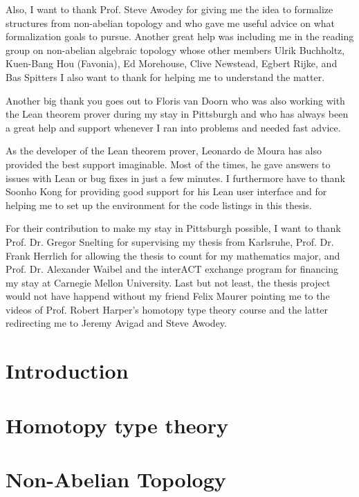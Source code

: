 \documentclass[12pt,headings=optiontohead]{book}
\theoremstyle{definition}
\begin{document}
Also, I want to thank Prof. Steve Awodey for giving me the idea to formalize structures
from non-abelian topology and who gave me useful advice on what formalization goals
to pursue.
Another great help was including me in the reading group on non-abelian algebraic
topology whose other members 
Ulrik Buchholtz, Kuen-Bang Hou (Favonia), Ed Morehouse, Clive Newstead, Egbert Rijke, and Bas Spitters
I also want to thank for helping me to understand the matter.

Another big thank you goes out to Floris van Doorn who was also working with the Lean
theorem prover during my stay in Pittsburgh and who has always been a great help
and support whenever I ran into problems and needed fast advice.

As the developer of the Lean theorem prover, Leonardo de Moura has also provided
the best support imaginable.
Most of the times, he gave answers to issues with Lean or bug fixes in just a
few minutes.
I furthermore have to thank Soonho Kong for providing good support for his Lean
user interface and for helping me to set up the environment for the code listings
in this thesis.

For their contribution to make my stay in Pittsburgh possible, I want to thank
Prof. Dr. Gregor Snelting for supervising my thesis from Karlsruhe,
Prof. Dr. Frank Herrlich for allowing the thesis to count for my mathematics major,
and Prof. Dr. Alexander Waibel and the interACT exchange program for financing my
stay at Carnegie Mellon University.
Last but not least, the thesis project would not have happend without my friend
Felix Maurer pointing me to the videos of Prof. Robert Harper's homotopy type
theory course and the latter redirecting me to Jeremy Avigad and Steve Awodey.

\clearpage

\tableofcontents
\mainmatter

\chapter{Introduction} \label{chapter:intro}



\chapter{Homotopy type theory} \label{chapter:hott}



\chapter{Non-Abelian Topology} \label{chapter:nat}
\end{document}
